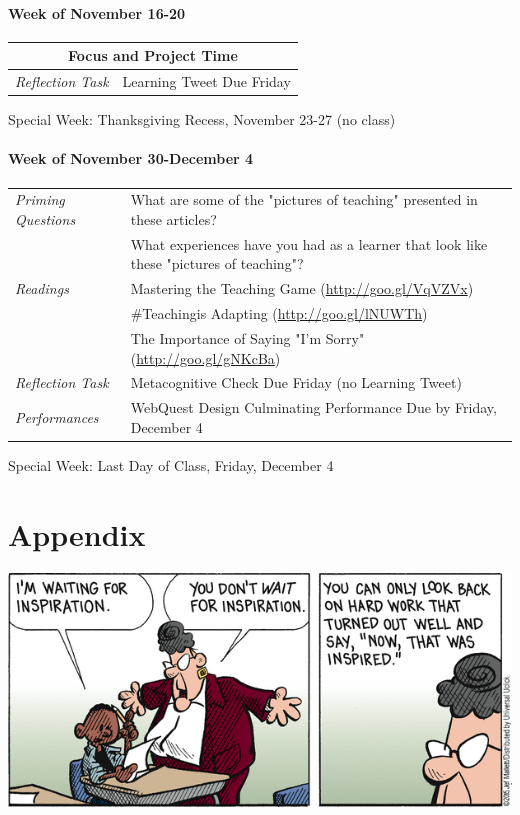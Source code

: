 \documentclass{tufte-handout}
\newcommand{\tabpq}{\faQuestionCircle\medspace\textit{Priming Questions}}
\newcommand{\tabread}{\faBook\medspace\textit{Readings}}
\newcommand{\tabperformance}{\faTasks\medspace\textit{Performances}}
\newcommand{\tabtweet}{\faLightbulbO\medspace\textit{Reflection Task} & Learning Tweet Due Friday \\}
\newcommand{\tabcheck}{\faLightbulbO\medspace\textit{Reflection Task} & Metacognitive Check Due Friday (no Learning Tweet) \\}
\newenvironment{tabsched}
	{\small
	\begin{tabular}{p{1.5in}p{4.5in}}
	\toprule}
	{\bottomrule
	\end{tabular}
	\normalsize}
\newenvironment{specweek}
	{\begin{center}
		\fontseries{b} \faBullhorn \medspace Special Week: }
		{\medspace \faBullhorn \fontseries{m}
	\end{center}}
\newcommand{\weekfourteen}{November 16-20}
\newcommand{\weekfifteen}{November 30-December 4}
\newcommand{\thanksgiving}{Thanksgiving Recess, November 23-27 (no class)}
\newcommand{\finisemester}{Last Day of Class, Friday, December 4}
\begin{document}
\subsection{Week of \weekfourteen}

\begin{tabsched}
	\multicolumn{2}{c}{\faLaptop\medspace\textbf{Focus and Project Time}\medspace\faLaptop} \\
	\midrule
	\tabtweet
\end{tabsched}

\begin{specweek}\thanksgiving\end{specweek}

\subsection{Week of \weekfifteen}

\begin{tabsched}
	\tabpq & What are some of the "pictures of teaching" presented in these articles? \\
	& What experiences have you had as a learner that look like these "pictures of teaching"? \\
	\midrule
	\tabread & Mastering the Teaching Game (\url{http://goo.gl/VqVZVx}) \\
	& \#Teachingis Adapting (\url{http://goo.gl/lNUWTh}) \\
	& The Importance of Saying "I'm Sorry" (\url{http://goo.gl/gNKcBa}) \\
	\midrule
	\tabcheck
	\midrule
	\tabperformance & WebQuest Design Culminating Performance Due by Friday, December 4 \\
\end{tabsched}

\begin{specweek}\finisemester\end{specweek}

\newpage



\newpage

\part{Appendix}

\begin{marginfigure}%
	\begin{center}
		\includegraphics[width=1\linewidth]{frazz-inspiration.png}
	\end{center}
\end{marginfigure}
\end{document}
